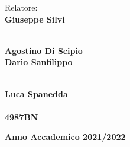 \begin{multicols}{2}
\noindent \large{Relatore:} \\
\large{\textbf{Giuseppe Silvi}} \\
\vspace{0.1cm}

 \\
\large{\textbf{Agostino Di Scipio}} \\
\large{\textbf{Dario Sanfilippo}} \\
\vspace{0.1cm}

\columnbreak

 \\
\large{\textbf{Luca Spanedda}} \\
 \\
\large{\textbf{4987BN}} \\
\end{multicols}

\vfill

\begin{center}
    \large{\textbf{Anno Accademico 2021/2022}}
\end{center}